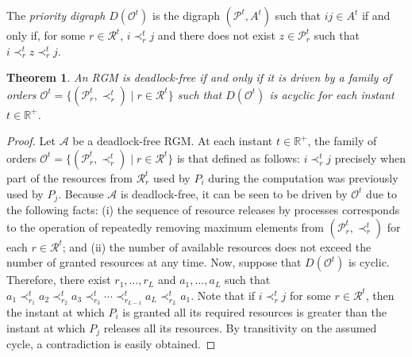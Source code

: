 \documentclass{article}
\newcommand{\Real}{{\mathbb R}}
\newcommand{\st}{\;|\;}
\newcommand{\set}[1][ ]{\{ #1 \}}
\newcommand{\R}{\mathcal{R}}
\newtheorem{thm}[lem]{Theorem}
\begin{document}
The \emph{priority digraph} $D(\mathcal{O}^t)$ is the digraph
$(\mathcal{P}^t, A^t)$ such that $ij \in A^t$ if and only if, for some
$r \in \mathcal{R}^t$, $i \prec^t_r j$ and there does not exist
$z \in \mathcal{P}^t_r$ such that $i \prec^t_r z \prec^t_r j$.

\begin{thm}
\label{CaracLivreDeadlock:Teorico}
An RGM is deadlock-free if and only if it is driven by a family of orders
$\mathcal{O}^t = \set [(\mathcal{P}^t_r, \prec^t_r) \st r \in \mathcal{R}^t]$
such that $D(\mathcal{O}^t)$ is acyclic for each instant $t \in \Real^+$.
\end{thm}

\begin{proof}
Let $\mathcal{A}$ be a deadlock-free RGM. At each instant $t \in \Real^+$, the
family of orders
$\mathcal{O}^t = \set [(\mathcal{P}^t_r, \prec^t_r) \st r \in \mathcal{R}^t]$ is
that defined as follows: $i \prec^t_r j$ precisely when part of the resources
from $\R^t_r$ used by $P_i$ during the computation was previously used by $P_j$.
Because $\mathcal{A}$ is deadlock-free, it can be seen to be driven by
$\mathcal{O}^t$ due to the following facts: (i) the sequence of resource
releases by processes corresponds to the operation of repeatedly removing
maximum elements from $(\mathcal{P}^t_r, \prec^t_r)$ for each
$r \in \mathcal{R}^t$; and (ii) the number of available resources does not
exceed the number of granted resources at any time. Now, suppose that
$D(\mathcal{O}^t)$ is cyclic. Therefore, there exist $r_1, \ldots, r_L$ and
$a_1, \ldots, a_L$ such that
$a_1 \prec^t_{r_1} a_2 \prec^t_{r_2} a_3 \prec^t_{r_3} \cdots \prec^t_{r_{L-1}} a_L \prec^t_{r_L} a_1$.
Note that if $i \prec^t_r j$ for some $r \in \mathcal{R}^t$, then the instant at
which $P_i$ is granted all its required resources is greater than the instant at
which $P_j$ releases all its resources. By transitivity on the assumed cycle, a
contradiction is easily obtained.


\end{proof}
\end{document}
